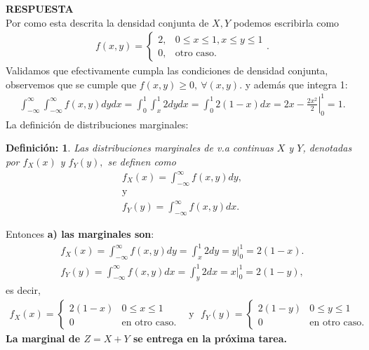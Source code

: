 \documentclass[11pt,letterpaper]{article}
\newcommand{\res}{\textbf{RESPUESTA}\\}
\newtheorem{thmd}{Definición:}
\newcommand{\intim}{\int_{-\infty}^\infty}
\begin{document}
\res Por como esta descrita la densidad conjunta de $X,Y$ podemos escribirla como 
\begin{align*}
f(x,y)=\left\{\begin{array}{cc}
2,& 0\leq x\leq 1, x\leq y\leq 1\\
0,& \text{otro caso}.
\end{array} .\right.
\end{align*}
Validamos que efectivamente cumpla las condiciones de densidad conjunta, observemos que se cumple que $f(x,y)\geq 0, \ \forall (x,y).$ y además que integra 1:
\begin{align*}
\intim \intim f(x,y)dydx=\int_0^1 \int_x^1 2 dydx=\int_0^1 2(1-x) dx=\left.2x-\frac{2x^2}{2}\right|_0^1=1.
\end{align*}
La definición de distribuciones marginales:
\begin{framed}
    \begin{thmd} \label{marginales}
	Las distribuciones marginales de v.a continuas $X$ y $Y$, denotadas por $f_X(x)$ y $f_Y(y),$ se definen como
	\begin{align*}
	f_X(x) = \intim f(x,y)dy,\\
	\text{y}\\
	f_Y(y)=\intim f(x,y)dx.
	\end{align*}
    \end{thmd}
\end{framed}
Entonces \textbf{a) las marginales son}:
\begin{align*}
f_X(x)=\intim f(x,y)dy =\int_x^1 2 dy=\left. y\right|_{0}^1=2(1-x).\\
f_Y(y)=\intim f(x,y)dx=\int_y^1 2 dx=\left. x\right|_{0}^1=2(1-y),
\end{align*} es decir,
\begin{align*}
f_X(x)=\left\{\begin{array}{cc}
2(1-x) & 0\leq x\leq 1\\
0 & \text{en otro caso.}
\end{array} \right.\ \ \ \ \text{y} \ \ \ f_Y(y)=\left\{\begin{array}{cc}
2(1-y) & 0\leq y\leq 1\\
0 & \text{en otro caso.}
\end{array} \right.
\end{align*} 
\textbf{La marginal de $Z=X+Y$ se entrega en la próxima tarea.}\\
\end{document}
